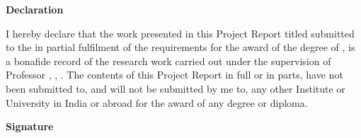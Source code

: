 \begin{flushright}
  \huge{\textbf{Declaration}}
\end{flushright}

\vspace{0.5cm}

I hereby declare that the work presented in this Project Report titled \ttitle{} submitted to the \univname{} in partial fulfilment of the requirements for the award of the degree of \degree{}, is a bonafide record of the research work carried out under the supervision of Professor \supname{}, \suppost{}, \supdeptname{}. The contents of this Project Report in full or in parts, have not been submitted to, and will not be submitted by me to, any other Institute or University in India or abroad for the award of any degree or diploma.

\vspace{2cm}

\begin{flushright}
  \large{\textbf{Signature}}\\[0.5cm]
  \emph{\authorname}\\
  \rn
\end{flushright}